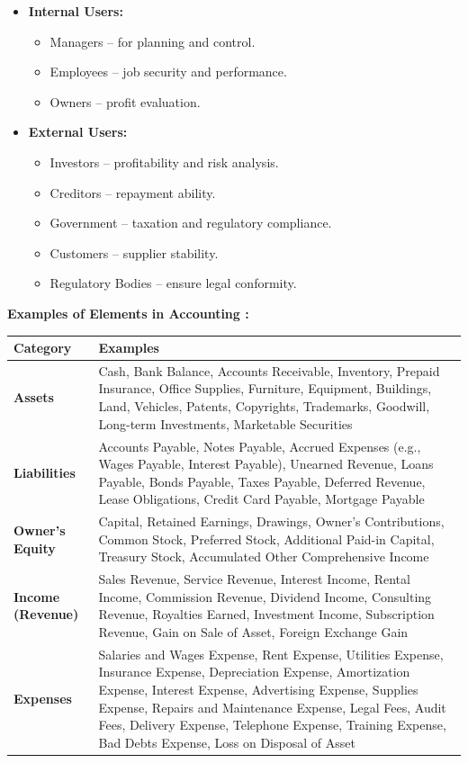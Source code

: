 \documentclass[12pt,a4paper]{book}
\begin{document}
\begin{itemize}
    \item \textbf{Internal Users:}
    \begin{itemize}
        \item Managers – for planning and control.
        \item Employees – job security and performance.
        \item Owners – profit evaluation.
    \end{itemize}
    
    \item \textbf{External Users:}
    \begin{itemize}
        \item Investors – profitability and risk analysis.
        \item Creditors – repayment ability.
        \item Government – taxation and regulatory compliance.
        \item Customers – supplier stability.
        \item Regulatory Bodies – ensure legal conformity.
    \end{itemize}
\end{itemize}

\vspace{0.5cm}
\textbf{Examples of Elements in Accounting :}

\begin{tabular}{|p{4cm}|p{12cm}|}
\hline
\textbf{Category} & \textbf{Examples} \\
\hline
\textbf{Assets} & 
Cash, Bank Balance, Accounts Receivable, Inventory, Prepaid Insurance, Office Supplies, Furniture, Equipment, Buildings, Land, Vehicles, Patents, Copyrights, 
Trademarks, Goodwill, Long-term Investments, Marketable Securities \\
\hline
\textbf{Liabilities} & 
Accounts Payable, Notes Payable, Accrued Expenses (e.g., Wages Payable, Interest Payable), Unearned Revenue, Loans Payable, Bonds Payable, Taxes Payable, Deferred Revenue, Lease Obligations, Credit Card Payable, Mortgage Payable \\
\hline
\textbf{Owner’s Equity} & 
Capital, Retained Earnings, Drawings, Owner’s Contributions, Common Stock, Preferred Stock, Additional Paid-in Capital, Treasury Stock, Accumulated Other Comprehensive Income \\
\hline
\textbf{Income (Revenue)} & 
Sales Revenue, Service Revenue, Interest Income, Rental Income, Commission Revenue, Dividend Income, Consulting Revenue, Royalties Earned, Investment Income, Subscription Revenue, Gain on Sale of Asset, Foreign Exchange Gain \\
\hline
\textbf{Expenses} & 
Salaries and Wages Expense, Rent Expense, Utilities Expense, Insurance Expense, Depreciation Expense, Amortization Expense, Interest Expense, Advertising Expense, Supplies Expense, Repairs and Maintenance Expense, Legal Fees, Audit Fees, Delivery Expense, Telephone Expense, Training Expense, Bad Debts Expense, Loss on Disposal of Asset \\
\hline
\end{tabular}
\end{document}
